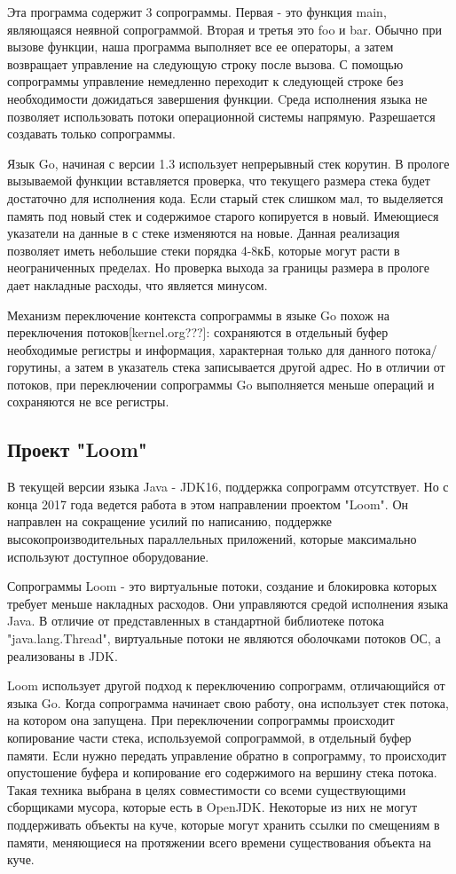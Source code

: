 	Эта программа содержит 3 сопрограммы. Первая - это функция main, являющаяся
	неявной сопрограммой. Вторая и третья это foo и bar. Обычно при вызове функции, наша программа 
	выполняет все ее операторы, а затем возвращает управление на следующую строку после вызова. 
	С помощью сопрограммы управление немедленно переходит к следующей строке без необходимости дожидаться завершения функции. Cреда исполнения языка не позволяет использовать потоки операционной системы
	напрямую. Разрешается создавать только сопрограммы.
	\par
	Язык Go, начиная с версии 1.3 использует непрерывный стек корутин. В прологе вызываемой функции вставляется проверка,
	что текущего размера стека будет достаточно для исполнения кода. Если старый стек слишком мал,
	то выделяется память под новый стек и содержимое старого копируется в новый. Имеющиеся указатели на
	данные в с стеке изменяются на новые. Данная реализация позволяет иметь небольшие стеки порядка 4-8кБ, которые
	могут расти в неограниченных пределах. Но проверка выхода за границы размера в прологе дает накладные расходы,
	что является минусом.
	\par 
	Механизм переключение контекста сопрограммы в языке Go похож на переключения потоков[kernel.org???]:
	сохраняются в отдельный буфер необходимые регистры и информация, характерная только для данного
	потока/горутины, а затем в указатель стека записывается другой адрес. Но в отличии от потоков, 
	при переключении сопрограммы Go выполняется меньше операций и сохраняются не все регистры\cite{go-context}.
	
	\subsection{Проект "Loom"}
	В текущей версии языка Java - JDK16, поддержка сопрограмм отсутствует. Но с конца 2017 года ведется 
	работа в этом направлении проектом "Loom". Он направлен на сокращение усилий по написанию, поддержке
	высокопроизводительных параллельных приложений, которые максимально используют доступное оборудование\cite{loom-main}.
	\par
	Сопрограммы Loom - это виртуальные потоки, создание и блокировка которых требует меньше накладных расходов\cite{loom-main}. Они управляются средой исполнения языка Java. 
	В отличие от представленных в стандартной библиотеке потока "java.lang.Thread", виртуальные потоки не являются
	оболочками потоков ОС, а реализованы в JDK.
	
	\par
	Loom использует другой подход к переключению сопрограмм, отличающийся от языка Go. Когда сопрограмма начинает
	свою работу, она использует стек потока, на котором она запущена. При переключении сопрограммы происходит
	копирование части стека, используемой сопрограммой, в отдельный буфер памяти. Если нужно передать 
	управление обратно в сопрограмму, то происходит опустошение буфера и копирование его содержимого на 
	вершину стека потока\cite{loom-main}. Такая техника выбрана в целях совместимости со всеми существующими 
	сборщиками мусора, которые есть в OpenJDK. Некоторые из них не могут поддерживать объекты на куче, которые
	могут хранить ссылки по смещениям в памяти, меняющиеся на протяжении всего времени существования объекта
	на куче.


